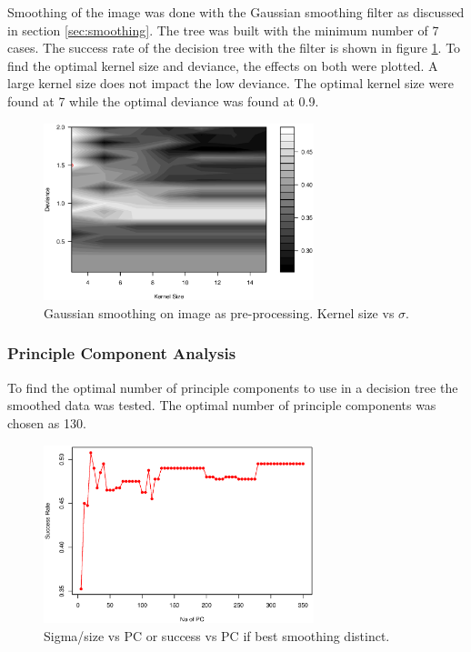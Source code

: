 Smoothing of the image was done with the Gaussian smoothing filter as discussed in section \ref{sec:smoothing}.
The tree was built with the minimum number of 7 cases.
The success rate of the decision tree with the filter is shown in figure \ref{fig:tree_smooth}.
To find the optimal kernel size and deviance, the effects on both were plotted.
A large kernel size does not impact the low deviance. The optimal kernel size were found at    7
while the optimal deviance was found at                                                        0.9.

\begin{figure}[H]
\centering
\includegraphics[width=0.7\textwidth]{graphics/tree_smooth}
\caption{Gaussian smoothing on image as pre-processing. Kernel size vs $\sigma$. }%
\label{fig:tree_smooth}
\end{figure}

\subsubsection{Principle Component Analysis}

To find the optimal number of principle components to use in a decision tree 
the smoothed data 
was tested.
The optimal number of principle components was chosen as 130.

\begin{figure}[H]
\centering
\includegraphics[width=0.7\textwidth]{graphics/tree_pca}
\caption{Sigma/size vs PC or success vs PC if best smoothing distinct.}
\end{figure}


